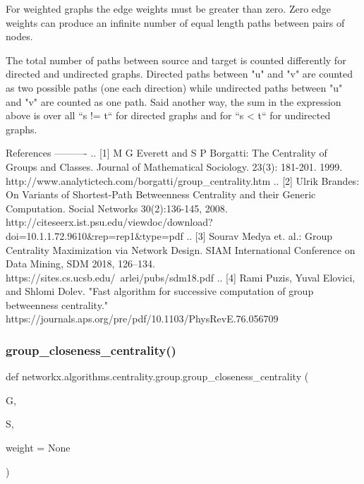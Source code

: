 \begin{DoxyVerb}
For weighted graphs the edge weights must be greater than zero.
Zero edge weights can produce an infinite number of equal length
paths between pairs of nodes.

The total number of paths between source and target is counted
differently for directed and undirected graphs. Directed paths
between "u" and "v" are counted as two possible paths (one each
direction) while undirected paths between "u" and "v" are counted
as one path. Said another way, the sum in the expression above is
over all ``s != t`` for directed graphs and for ``s < t`` for undirected graphs.


References
----------
.. [1] M G Everett and S P Borgatti:
   The Centrality of Groups and Classes.
   Journal of Mathematical Sociology. 23(3): 181-201. 1999.
   http://www.analytictech.com/borgatti/group_centrality.htm
.. [2] Ulrik Brandes:
   On Variants of Shortest-Path Betweenness
   Centrality and their Generic Computation.
   Social Networks 30(2):136-145, 2008.
   http://citeseerx.ist.psu.edu/viewdoc/download?doi=10.1.1.72.9610&rep=rep1&type=pdf
.. [3] Sourav Medya et. al.:
   Group Centrality Maximization via Network Design.
   SIAM International Conference on Data Mining, SDM 2018, 126–134.
   https://sites.cs.ucsb.edu/~arlei/pubs/sdm18.pdf
.. [4] Rami Puzis, Yuval Elovici, and Shlomi Dolev.
   "Fast algorithm for successive computation of group betweenness centrality."
   https://journals.aps.org/pre/pdf/10.1103/PhysRevE.76.056709\end{DoxyVerb}
 \mbox{\label{namespacenetworkx_1_1algorithms_1_1centrality_1_1group_a2324c06b3f7319f1c38d129109e05513}} 
\subsubsection{\texorpdfstring{group\+\_\+closeness\+\_\+centrality()}{group\_closeness\_centrality()}}
{\footnotesize\ttfamily def networkx.\+algorithms.\+centrality.\+group.\+group\+\_\+closeness\+\_\+centrality (\begin{DoxyParamCaption}\item[{}]{G,  }\item[{}]{S,  }\item[{}]{weight = {\ttfamily None} }\end{DoxyParamCaption})}

